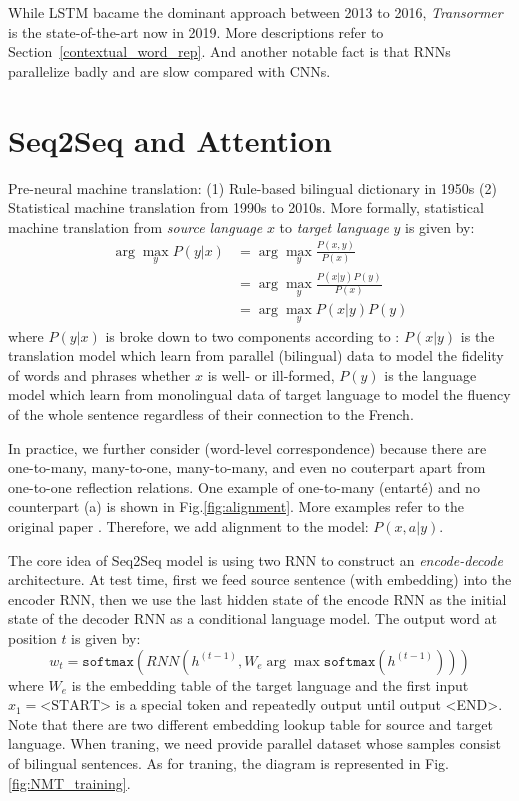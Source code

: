 While LSTM bacame the dominant approach between 2013 to 2016, \emph{Transormer} is the state-of-the-art now in 2019.
More descriptions refer to Section~\ref{contextual_word_rep}.
And another notable fact is that RNNs parallelize badly and are slow compared with CNNs.

\section{Seq2Seq and Attention}
Pre-neural machine translation: (1) Rule-based bilingual dictionary in 1950s (2) Statistical machine translation from 1990s to 2010s.
More formally, statistical machine translation from \emph{source language} $x$ to \emph{target language} $y$ is given by:
\begin{align}
\arg \max_y P(y | x) &= \arg \max_y \frac{P(x, y)}{P(x)} \nonumber \\
&= \arg \max_y \frac{P(x | y) P(y)}{P(x)} \nonumber \\
&= \arg \max_y P(x | y) P(y) \nonumber
\end{align}
where $P(y | x)$ is broke down to two components according to : $P(x | y)$ is the translation model which learn from parallel (bilingual) data to model the fidelity of words and phrases whether $x$ is well- or ill-formed, $P(y)$ is the language model which learn from monolingual data of target language to model the fluency of the whole sentence regardless of their connection to the French. 


In practice, we further consider  (word-level correspondence) because there are one-to-many, many-to-one, many-to-many, and even no couterpart apart from one-to-one reflection relations.
One example of one-to-many (entarté) and no counterpart (a) is shown in Fig.\ref{fig:alignment}.
More examples refer to the original paper .
Therefore, we add alignment to the model: $P(x, a | y)$.

The core idea of Seq2Seq model is using two RNN to construct an \emph{encode-decode} architecture.
At test time, first we feed source sentence (with embedding) into the encoder RNN, then we use the last hidden state of the encode RNN as the initial state of the decoder RNN as a conditional language model.
The output word at position $t$ is given by:
\begin{equation}
w_t = \texttt{softmax}(RNN(h^{(t-1)}, W_e \arg \max \texttt{softmax}(h^{(t-1)}))) \nonumber
\end{equation}
where $W_e$ is the embedding table of the target language and the first input $x_1 = \text{<START>}$ is a special token and repeatedly output until output <END>.
Note that there are two different embedding lookup table for source and target language.
When traning, we need provide parallel dataset whose samples consist of bilingual sentences.
As for traning, the diagram is represented in Fig.\ref{fig:NMT_training}.

